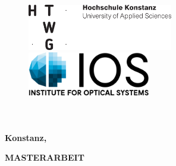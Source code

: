 \begin{titlepage}

\vspace*{-2.5cm}

\begin{figure}[h]
\hspace*{-2cm}
\includegraphics[height=2cm]{title/HTWG-Logo_en_300dpi.png}
\hspace*{4cm}\includegraphics[height=2cm,]{title/IOS_Logo2016_lettering_en.png}


\end{figure}

\vspace{2cm}

\begin{center}
	 \LARGE{
		\textbf{\thema} \\[5cm]
	}
	\Large{
		\textbf{\autor}} \\[5.5cm]
	\large{
		\textbf{Konstanz, \abgabedatum} \\[2.3cm]
	}
	
	\Huge{
		\textbf{{\sf MASTERARBEIT}}
	}
\end{center}

\end{titlepage}
